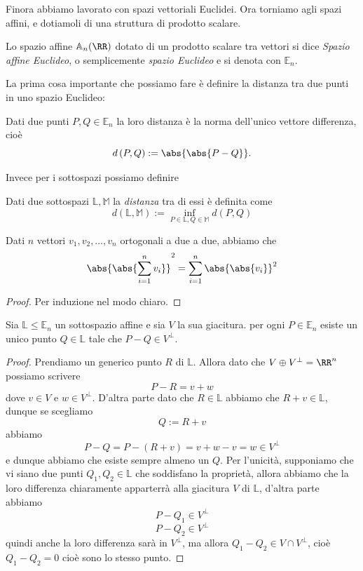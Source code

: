 \documentclass[11pt]{scrartcl}
\renewcommand{\AA}{\mathbb{A}}
\begin{document}
   	 Finora abbiamo lavorato con spazi vettoriali Euclidei. Ora torniamo agli spazi affini, e dotiamoli di una struttura di prodotto scalare. 
   	 \begin{definition}
   	 	Lo spazio affine $\AA_n(\RR)$ dotato di un prodotto scalare tra vettori si dice \textit{Spazio affine Euclideo}, o semplicemente \textit{spazio Euclideo} e si denota con $\mathbb{E}_n$.
   	 \end{definition}
   	 La prima cosa importante che possiamo fare è definire la distanza tra due punti in uno spazio Euclideo:
   	 \begin{definition}
   	 	Dati due punti $P,Q\in \mathbb{E}_n$ la loro distanza è la norma dell'unico vettore differenza, cioè
   	 	$$d\left(P,Q\right):=\abs{\abs{P-Q}}.$$
   	 \end{definition}
   	 Invece per i sottospazi possiamo definire
   	 \begin{definition}
   	 	Dati due sottospazi $\mathbb{L},\mathbb{M}$ la \textit{distanza} tra di essi è definita come
   	 	$$d(\mathbb{L},\mathbb{M}):=\inf_{P\in \mathbb{L},Q\in \mathbb{M}}d(P,Q)$$
   	 \end{definition}
   	 \begin{theorem}[Pitagora]
   	 	Dati $n$ vettori $v_1,v_2,\dots,v_n$ ortogonali a due a due, abbiamo che 
   	 	$$\abs{\abs{\sum_{i=1}^{n}v_i}}^2=\sum_{i=1}^{n}\abs{\abs{v_i}}^2$$
   	 \end{theorem}
   	 \begin{proof}
   	 	Per induzione nel modo chiaro.
   	 \end{proof}
   	 \begin{lemma}
   	 	Sia $\mathbb{L}\le \mathbb{E}_n$ un sottospazio affine e sia $V$ la sua giacitura. per ogni $P\in\mathbb{E}_n$ esiste un unico punto $Q\in\mathbb{L}$ tale che $P-Q\in V^\perp$.
   	 \end{lemma}
   	 \begin{proof}
   	 	Prendiamo un generico punto $R$ di $\mathbb{L}$. Allora dato che $V\oplus V^\perp=\RR^n$ possiamo scrivere 
   	 	$$P-R=v+w$$
   	 	dove $v\in V $ e $w\in  V^\perp$. D'altra parte dato che $R\in\mathbb{L}$ abbiamo che $R+v\in\mathbb{L}$, dunque se scegliamo
   	 	$$Q:=R+v$$ 
   	 	abbiamo
   	 	$$P-Q=P-(R+v)=v+w-v=w\in V^\perp$$
   	 	e dunque abbiamo che esiste sempre almeno un $Q$. Per l'unicità, supponiamo che vi siano due punti $Q_1,Q_2\in\mathbb{L}$ che soddisfano la proprietà, allora abbiamo che la loro differenza chiaramente apparterrà alla giacitura $V$ di $\mathbb{L}$, d'altra parte abbiamo
   	 	$$P-Q_1\in V^\perp$$
   	 	$$P-Q_2\in V^\perp$$
   	 	quindi anche la loro differenza sarà in $V^\perp$, ma allora $Q_1-Q_2\in V\cap V^\perp$, cioè $Q_1-Q_2=0$ cioè sono lo stesso punto.
   	 \end{proof}
   	 
\end{document}
